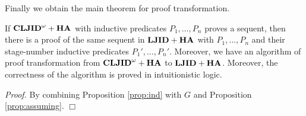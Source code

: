 Finally we obtain the main theorem for proof transformation.

\begin{Th}
If ${{\bf CLJID}^\omega+{\bf HA}}$ with inductive predicates $P_1,\ldots,P_n$ proves a sequent,
then there is a proof of the same sequent in ${{\bf LJID}+{\bf HA}}$ with $P_1,\ldots,P_n$ and their stage-number inductive predicates $P_1',\ldots,P_n'$.
Moreover, we have an algorithm of
proof transformation from ${{\bf CLJID}^\omega+{\bf HA}}$ to ${{\bf LJID}+{\bf HA}}$.
Moreover, the correctness of the algorithm is proved in intuitionistic logic.
\end{Th}

{\em Proof.}
By combining Proposition \ref{prop:ind} with $G$ and
Proposition \ref{prop:assuming}.
$\Box$